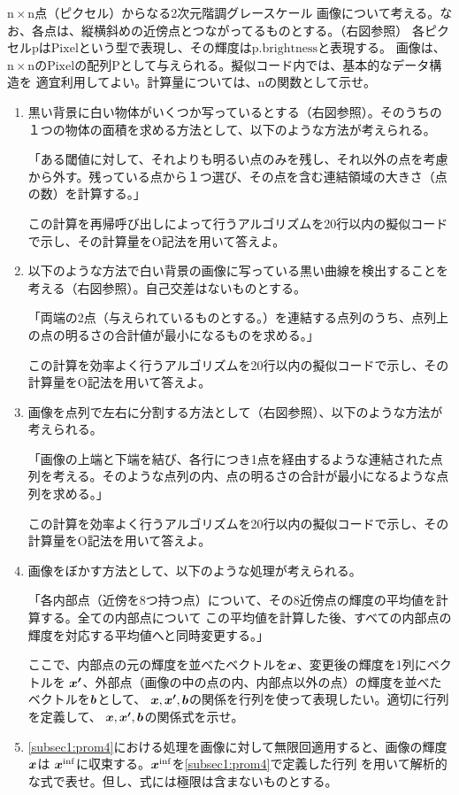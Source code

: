 \documentclass[dvipdfmx,titlepage, 11pt, a4paper]{jsarticle}%
\begin{document}
$\mathrm{n\times n}$点（ピクセル）からなる2次元階調グレースケール
画像について考える。なお、各点は、縦横斜めの近傍点とつながってるものとする。（右図参照）
各ピクセル$\mathrm{p}$は$\mathrm{Pixel}$という型で表現し、その輝度は$\mathrm{p.brightness}$と表現する。
画像は、$\mathrm{n\times n}$の$\mathrm{Pixel}$の配列$\mathrm{P}$として与えられる。擬似コード内では、基本的なデータ構造を
適宜利用してよい。計算量については、$\mathrm{n}$の関数として示せ。
\begin{enumerate}[(1)]
    \setlength{\itemsep}{10pt}
    \item 黒い背景に白い物体がいくつか写っているとする（右図参照）。そのうちの１つの物体の面積を求める方法として、以下のような方法が考えられる。\label{subsec1:prom1}
    
    「ある閾値に対して、それよりも明るい点のみを残し、それ以外の点を考慮から外す。残っている点から１つ選び、その点を含む連結領域の大きさ（点の数）を計算する。」

    この計算を再帰呼び出しによって行うアルゴリズムを20行以内の擬似コードで示し、その計算量をO記法を用いて答えよ。
    \item 以下のような方法で白い背景の画像に写っている黒い曲線を検出することを考える（右図参照）。自己交差はないものとする。\label{subsec1:prom2}
    
    「両端の2点（与えられているものとする。）を連結する点列のうち、点列上の点の明るさの合計値が最小になるものを求める。」

    この計算を効率よく行うアルゴリズムを20行以内の擬似コードで示し、その計算量をO記法を用いて答えよ。
    \item 画像を点列で左右に分割する方法として（右図参照）、以下のような方法が考えられる。\label{subsec1:prom3}
    
    「画像の上端と下端を結び、各行につき1点を経由するような連結された点列を考える。そのような点列の内、点の明るさの合計が最小になるような点列を求める。」

    この計算を効率よく行うアルゴリズムを20行以内の擬似コードで示し、その計算量をO記法を用いて答えよ。
    \item 画像をぼかす方法として、以下のような処理が考えられる。\label{subsec1:prom4}
    
    「各内部点（近傍を8つ持つ点）について、その8近傍点の輝度の平均値を計算する。全ての内部点について
    この平均値を計算した後、すべての内部点の輝度を対応する平均値へと同時変更する。」

    ここで、内部点の元の輝度を並べたベクトルを$\mbox{\boldmath $x$}$、変更後の輝度を1列にベクトルを
    $\mbox{\boldmath $x'$}$、外部点（画像の中の点の内、内部点以外の点）の輝度を並べたベクトルを$\mbox{\boldmath $b$}$として、
    $\mbox{\boldmath $x$},\mbox{\boldmath $x'$},\mbox{\boldmath $b$}$の関係を行列を使って表現したい。適切に行列を定義して、
    $\mbox{\boldmath $x$},\mbox{\boldmath $x'$},\mbox{\boldmath $b$}$の関係式を示せ。
    \item \eqref{subsec1:prom4}における処理を画像に対して無限回適用すると、画像の輝度$\mbox{\boldmath $x$}$は
    $\mbox{\boldmath $x$}^{\mathrm{inf}}$に収束する。$\mbox{\boldmath $x$}^{\mathrm{inf}}$を\eqref{subsec1:prom4}で定義した行列
    を用いて解析的な式で表せ。但し、式には極限は含まないものとする。
\end{enumerate}
\end{document}
